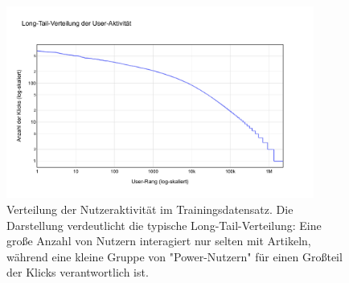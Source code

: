 
\begin{figure}[H]
    \centering
    \includegraphics[width=0.9\textwidth]{content/figures/svg/nutzer_verteilung_train.pdf}
    \caption{Verteilung der Nutzeraktivität im Trainingsdatensatz. Die Darstellung verdeutlicht die typische Long-Tail-Verteilung: Eine große Anzahl von Nutzern interagiert nur selten mit Artikeln, während eine kleine Gruppe von "Power-Nutzern" für einen Großteil der Klicks verantwortlich ist.}
    \label{fig:nutzerverteilung_train}
\end{figure}
